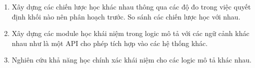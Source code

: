 \begin{enumerate}
	\item Xây dựng các chiến lược học khác nhau thông qua các độ đo trong việc quyết định khối nào nên phân hoạch trước. So sánh các chiến lược học với nhau.
	
	\item Xây dựng các module học khái niệm trong logic mô tả với các ngữ cảnh khác 	nhau như là một API cho phép tích hợp vào các hệ thống khác.
	
	\item Nghiên cứu khả năng học chính xác khái niệm cho các logic mô tả khác nhau.
\end{enumerate}
\cleardoublepage